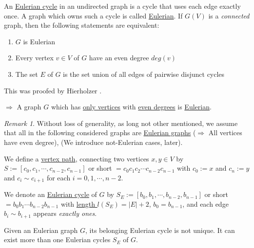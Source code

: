 \documentclass{article}
\newtheorem*{theorem A}{Theorem A}
\newtheorem*{theorem B}{N\"olker's Theorem}
\theoremstyle{remark}
\newtheorem{remark}{Remark}[section]
\theoremstyle{remark}
\begin{document}
\vspace{0.3cm}
An \underline{Eulerian cycle} in an undirected graph is a cycle that uses each edge exactly once. A graph which owns such a cycle is called \underline{Eulerian}. If $G\left(V\right)$ is a \textit{connected} graph, then the following statements are equivalent:

\begin{enumerate}
    \item $G$ is Eulerian
    \item Every vertex $v \in V$ of $G$ have an even degree $deg\left(v\right)$
    \item The set $E$ of $G$ is the set union of all edges of pairwise disjunct cycles
\label{enum:euleriancycle}
\end{enumerate}

This was proofed by Hierholzer \cite{hierholzer1873moglichkeit}.

\vspace{0.3cm}
$\Rightarrow$ A graph $G$ which has \underline{only vertices} with \underline{even degrees} is \underline{Eulerian}.

\vspace{0.3cm}
\begin{remark}
    Without loss of generality, as long not other mentioned, we assume that all in the following considered graphs are \underline{Eulerian graphs} ($\Rightarrow$ All vertices have even degree), (We introduce not-Eulerian cases, later).
\label{remark:euleriangraphs}
\end{remark}

\vspace{0.3cm}
We define a \underline{vertex path}, connecting two vertices $x,y \in V$ by $S := \left[ c_{0},c_{1}, \cdots, c_{n-2}, c_{n-1} \right]$ or short $ = c_{0}c_{1}c_{2}\cdots c_{n-2}c_{n-1}$ with $c_{0} := x$ and $c_{n} := y$ and $c_{i} \sim c_{i+1}$ for each $i = 0,1,\cdots,n-2$.

\vspace{0.3cm}
We denote an \underline{Eulerian cycle} of $G$ by $S_{E} := \left[b_{0},b_{1}, \cdots, b_{n-2}, b_{n-1}\right]$ or short $ = b_{0}b_{1}\cdots b_{n-2}b_{n-1}$ with \underline{length $l\left(S_{E}\right) = |E| + 2$}, \underline{$b_{0} = b_{n-1}$}, and each edge $b_{i} \sim b_{i+1}$ appears \textit{exactly ones}.

\vspace{0.3cm}
Given an Eulerian graph $G$, its belonging Eulerian cycle is not unique. It can exist more than one Eulerian cycles $S_{E}$ of $G$.
\end{document}
